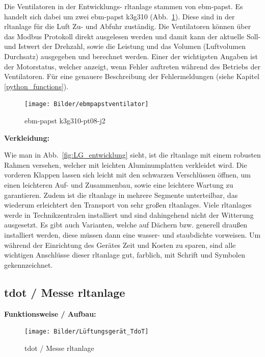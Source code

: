 Die Ventilatoren in der Entwicklungs- \ac{rltanlage} stammen von ebm-papst. Es handelt sich dabei um zwei ebm-papst k3g310 (Abb.~\ref{fig:ebmpapstventilator}). Diese sind in der \ac{rltanlage} für die Luft Zu- und Abfuhr zuständig. Die Ventilatoren können über das Modbus Protokoll direkt ausgelesen werden und damit kann der aktuelle Soll- und Istwert der Drehzahl, sowie die Leistung und das Volumen (Luftvolumen Durchsatz) ausgegeben und berechnet werden. Einer der wichtigsten Angaben ist der Motorstatus, welcher anzeigt, wenn Fehler auftreten während des Betriebs der Ventilatoren. Für eine genauere Beschreibung der Fehlermeldungen (siehe Kapitel \ref{python_functions}).

\begin{figure}[H]
	\centering
	\texttt{[image: Bilder/ebmpapstventilator]}
	\caption{ebm-papst k3g310-pt08-j2} 
	\label{fig:ebmpapstventilator}
\end{figure}

\textbf{Verkleidung:}

Wie man in Abb.~\ref{fig:LG_entwicklung} sieht, ist die \ac{rltanlage} mit einem robusten Rahmen versehen, welcher mit leichten Aluminumplatten verkleidet wird. Die vorderen Klappen lassen sich leicht mit den schwarzen Verschlüssen öffnen, um einen leichteren Auf- und Zusammenbau, sowie eine leichtere Wartung zu garantieren. Zudem ist die \ac{rltanlage} in mehrere Segmente unterteilbar, das wiederum erleichtert den Transport von sehr großen \acp{rltanlage}. Viele \acp{rltanlage} werde in Technikzentralen installiert und sind dahingehend nicht der Witterung ausgesetzt. Es gibt auch Varianten, welche auf Dächern bzw. generell draußen installiert werden, diese müssen dann eine wasser- und staubdichte vorweisen. Um während der Einrichtung des Gerätes Zeit und Kosten zu sparen, sind alle wichtigen Anschlüsse dieser \ac{rltanlage} gut, farblich, mit Schrift und Symbolen gekennzeichnet. 




\newpage
\subsection{\gls{tdot} / Messe \ac{rltanlage}}

\textbf{Funktionsweise / Aufbau:}
\begin{figure}[H]
	\centering
	\texttt{[image: Bilder/Lüftungsgerät\_TdoT]}
	\caption{\gls{tdot} / Messe \ac{rltanlage}} 
	\label{fig:LG_tdot}
\end{figure}

